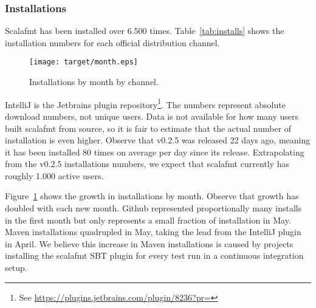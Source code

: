 \subsubsection{Installations}
Scalafmt has been installed over 6.500 times.
  Table~\ref{tab:installs} shows the installation numbers for each official distribution channel.
  \begin{figure}
    \CenterFloatBoxes
    \begin{floatrow}
      \ffigbox
      {\texttt{[image: target/month.eps]}}
      {\caption{Installations by month by channel.}\label{fig:installs}}
      \killfloatstyle
    \end{floatrow}
  \end{figure}
IntelliJ is the Jetbrains plugin repository\footnote{
  See \url{https://plugins.jetbrains.com/plugin/8236?pr=}
}.
The numbers represent absolute download numbers, not unique users.
Data is not available for how many users built scalafmt from source, so it is fair to estimate that the actual number of installation is even higher.
Observe that v0.2.5 was released 22 days ago, meaning it has been installed 80 times on average per day since its release.
Extrapolating from the v0.2.5 installations numbers, we expect that scalafmt currently has roughly 1.000 active users.

Figure~\ref{fig:installs} shows the growth in installations by month.
Observe that growth has doubled with each new month.
Github represented proportionally many installs in the first month but only represents a small fraction of installation in May.
Maven installations quadrupled in May, taking the lead from the IntelliJ plugin in April.
We believe this increase in Maven installations is caused by projects installing the scalafmt SBT plugin for every test run in a continuous integration setup.



